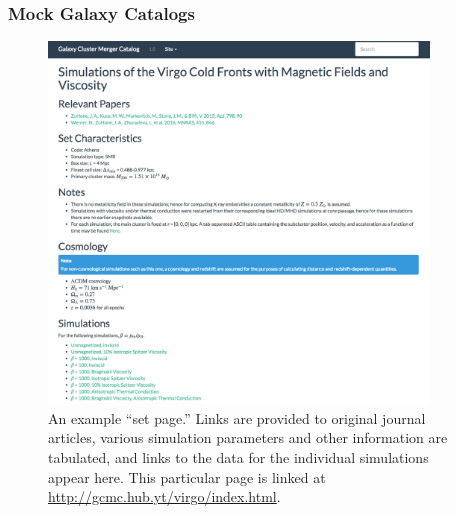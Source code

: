 \documentclass{emulateapj}
\begin{document}
\subsubsection{Mock Galaxy Catalogs}\label{sec:galaxies}

\begin{figure}
\begin{center}
\includegraphics[width=0.9\textwidth]{set_page.eps}
\caption{An example ``set page.'' Links are provided to original journal articles, various simulation parameters and other information are tabulated, and links to the data for the individual simulations appear here. This particular page is linked at \url{http://gcmc.hub.yt/virgo/index.html}.\label{fig:set_page}}
\end{center}
\end{figure}
\end{document}
